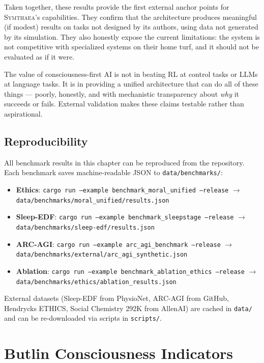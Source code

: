 \documentclass[12pt]{book}
\newcommand{\symthaea}{\textsc{Symthaea}}
\begin{document}
Taken together, these results provide the first external anchor points for \symthaea{}'s capabilities. They confirm that the architecture produces meaningful (if modest) results on tasks not designed by its authors, using data not generated by its simulation. They also honestly expose the current limitations: the system is not competitive with specialized systems on their home turf, and it should not be evaluated as if it were.

The value of consciousness-first AI is not in beating RL at control tasks or LLMs at language tasks. It is in providing a unified architecture that can do all of these things --- poorly, honestly, and with mechanistic transparency about \textit{why} it succeeds or fails. External validation makes these claims testable rather than aspirational.

\section{Reproducibility}

All benchmark results in this chapter can be reproduced from the repository. Each benchmark saves machine-readable JSON to \texttt{data/benchmarks/}:

\begin{itemize}
  \item \textbf{Ethics}: \texttt{cargo run --example benchmark\_moral\_unified --release} $\to$ \texttt{data/benchmarks/moral\_unified/results.json}
  \item \textbf{Sleep-EDF}: \texttt{cargo run --example benchmark\_sleepstage --release} $\to$ \texttt{data/benchmarks/sleep-edf/results.json}
  \item \textbf{ARC-AGI}: \texttt{cargo run --example arc\_agi\_benchmark --release} $\to$ \texttt{data/benchmarks/external/arc\_agi\_synthetic.json}
  \item \textbf{Ablation}: \texttt{cargo run --example benchmark\_ablation\_ethics --release} $\to$ \texttt{data/benchmarks/ethics/ablation\_results.json}
\end{itemize}

External datasets (Sleep-EDF from PhysioNet, ARC-AGI from GitHub, Hendrycks ETHICS, Social Chemistry 292K from AllenAI) are cached in \texttt{data/} and can be re-downloaded via scripts in \texttt{scripts/}.


\chapter{Butlin Consciousness Indicators}
\label{ch:butlin}
\end{document}
